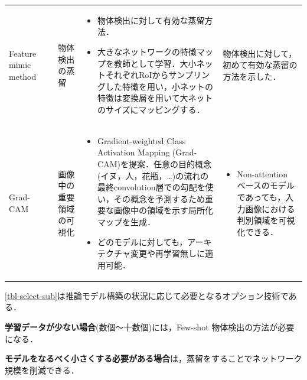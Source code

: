 \documentclass[originalpaper]{jsaiart}     %
\begin{document}
\begin{table}
\begin{center}
\begin{tabularx}{\linewidth}{Xp{1.5cm}Xp{7cm}X}
            Feature mimic method & \cite{LJY17} & 物体検出の蒸留 & 
            \begin{itemize}
                \vspace{-0.7\baselineskip}
                \setlength{\leftskip}{-3mm}
                \item 物体検出に対して有効な蒸留方法．
                \item 大きなネットワークの特徴マップを教師として学習．大小ネットそれぞれRoIからサンプリングした特徴を用い，小ネットの特徴は変換層を用いて大ネットのサイズにマッピングする．
            \end{itemize}
            & 物体検出に対して，初めて有効な蒸留の方法を示した．\\

            Grad-CAM & \cite{SCDVPB17,SCDVPB20} & 画像中の重要領域の可視化 & 
            \begin{itemize}
                \vspace{-0.7\baselineskip}
                \setlength{\leftskip}{-3mm}
                \item Gradient-weighted Class Activation Mapping (Grad-CAM)を提案．任意の目的概念(イヌ，人，花瓶，…)の流れの最終convolution層での勾配を使い，その概念を予測するため重要な画像中の領域を示す局所化マップを生成．
                \item どのモデルに対しても，アーキテクチャ変更や再学習無しに適用可能．
            \end{itemize}
            &
            \begin{itemize}
                \vspace{-0.7\baselineskip}
                \setlength{\leftskip}{-3mm}
                \item Non-attention ベースのモデルであっても，入力画像における判別領域を可視化できる．
            \end{itemize}
            \\
            \bottomrule
        \end{tabularx}
    \end{center}
\end{table}%
\ref{tbl-select-sub}は推論モデル構築の状況に応じて必要となるオプション技術である．

{\bf 学習データが少ない場合}(数個〜十数個)には，Few-shot 物体検出の方法が必要になる\cite{WHGDY20}．

{\bf モデルをなるべく小さくする必要がある場合}は，蒸留をすることでネットワーク規模を削減できる\cite{LJY17}．
\end{document}
